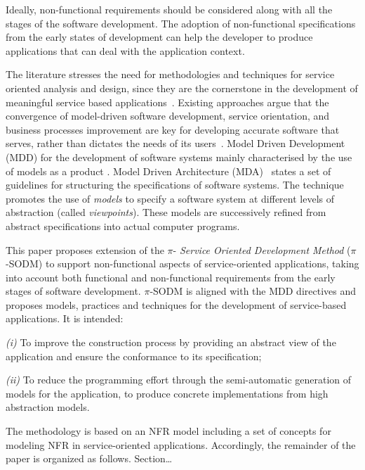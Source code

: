 Ideally, non-functional requirements should be considered along with all the stages of the software development.
The adoption of non-functional specifications from the early states of development
can help the developer to produce applications that  can deal with
the application context.

The literature stresses the need for methodologies and techniques for service oriented analysis and design, since they are the cornerstone in the development of meaningful service based applications~\cite{5}. Existing approaches argue that the convergence of model-driven software development, service orientation,   and  business processes improvement are key for developing accurate  software that serves, rather than dictates the needs of its users~\cite{watson}. Model Driven Development (MDD)  for the development of software systems mainly characterised by the use of models as a product \cite{Selic03}.
Model Driven Architecture (MDA)~\cite{miller} states a set of guidelines for structuring the specifications of software systems. The technique promotes  the use of \textit{models} to specify a software system at different levels of abstraction (called \textit{viewpoints}).
These models are successively refined from abstract specifications into actual computer programs.

This paper proposes  extension of the $\pi$-\textit{ Service Oriented Development Method} ($\pi$-SODM)
to support non-functional aspects of service-oriented applications, taking into account both functional and non-functional requirements from the early stages of software development.
$\pi$-SODM is aligned with the MDD directives and proposes models, practices and techniques for the development of service-based applications. It is intended:
\begin{trivlist}
\item \textit{(i)} To improve the construction process by providing an abstract view of the application and ensure the conformance to its specification;
\item \textit{(ii)} To reduce the programming effort through the semi-automatic generation of  models for the application, to produce concrete implementations from high abstraction models.
\end{trivlist}


 The methodology is based on  an NFR model including a set of concepts  for  modeling  NFR in service-oriented applications.
Accordingly, the remainder of the paper is organized as follows.
Section\dots





